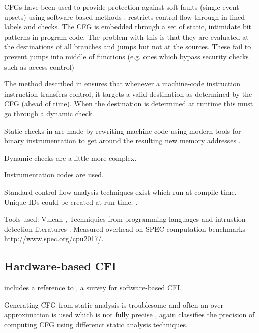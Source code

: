 CFGs have been used to provide protection against soft faults (single-event upsets) using software based methods \cite{Oh2002} \cite{Sharma2012} \cite{Venkatasubramanian2003}. 
\cite{Abadi2005} restricts control flow through in-lined labels and checks. The CFG is embedded through a set of static, intimidate bit patterns in program code. The problem with this is that they are evaluated at the destinations of all branches and jumps but not at the sources. These fail to prevent jumps into middle of functions (e.g. ones which bypass security checks such as access control)

The method described in \cite{Abadi2005} ensures that whenever a machine-code instruction instruction transfers control, it targets a valid destination as determined by the CFG (ahead of time). When the destination is determined at runtime this must go through a dynamic check.

Static checks in \cite{Abadi2005} are made by rewriting machine code using modern tools for binary instrumentation to get around the resulting new memory addresses \cite{Edwards2001} \cite{Srivastava1994}.

Dynamic checks are a little more complex.  

Instrumentation codes are used. 

Standard control flow analysis techniques exist \cite{AhoAlfredV.2014C:pt} \cite{Atkinson} \cite{Wagner2002} which run at compile time. Unique IDs could be created at run-time. .

Tools used: Vulcan \cite{Edwards2001}, Techniquies from programming languages and intrustion detection literatures \cite{AhoAlfredV.2014C:pt} \cite{Feng2003} \cite{Gopalakrishna2005} \cite{Wagner2002}. Measured overhead on SPEC computation benchmarks http://www.spec.org/cpu2017/.

\subsection{Hardware-based CFI}

\cite{DeClercq2017} includes a reference to \cite{Burow} , a survey for software-based CFI.

Generating CFG from static analysis is troublesome and often an over-approximation is used which is not fully precise \cite{Carlini2015} \cite{Kinder2012}, again \cite{Burow} classifies the precision of computing CFG using differenct static analysis techniques.

